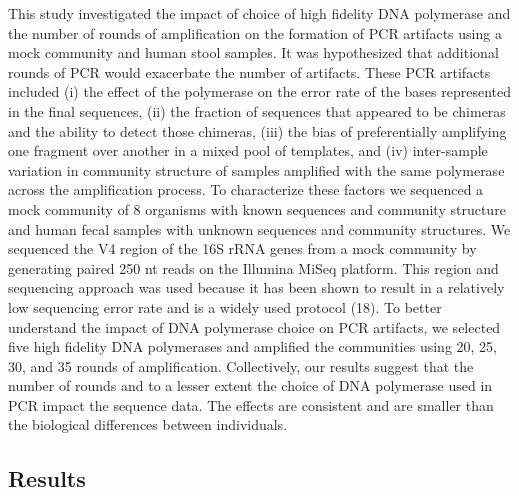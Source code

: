 \documentclass[11pt,]{article}
\begin{document}
This study investigated the impact of choice of high fidelity DNA
polymerase and the number of rounds of amplification on the formation of
PCR artifacts using a mock community and human stool samples. It was
hypothesized that additional rounds of PCR would exacerbate the number
of artifacts. These PCR artifacts included (i) the effect of the
polymerase on the error rate of the bases represented in the final
sequences, (ii) the fraction of sequences that appeared to be chimeras
and the ability to detect those chimeras, (iii) the bias of
preferentially amplifying one fragment over another in a mixed pool of
templates, and (iv) inter-sample variation in community structure of
samples amplified with the same polymerase across the amplification
process. To characterize these factors we sequenced a mock community of
8 organisms with known sequences and community structure and human fecal
samples with unknown sequences and community structures. We sequenced
the V4 region of the 16S rRNA genes from a mock community by generating
paired 250 nt reads on the Illumina MiSeq platform. This region and
sequencing approach was used because it has been shown to result in a
relatively low sequencing error rate and is a widely used protocol (18).
To better understand the impact of DNA polymerase choice on PCR
artifacts, we selected five high fidelity DNA polymerases and amplified
the communities using 20, 25, 30, and 35 rounds of amplification.
Collectively, our results suggest that the number of rounds and to a
lesser extent the choice of DNA polymerase used in PCR impact the
sequence data. The effects are consistent and are smaller than the
biological differences between individuals.

\newpage

\hypertarget{results}{%
\subsection{Results}\label{results}}
\end{document}
